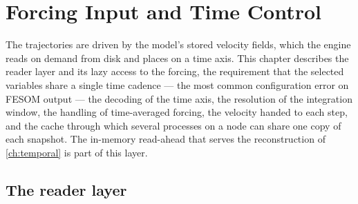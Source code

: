\chapter{Forcing Input and Time Control}\label{ch:input}

The trajectories are driven by the model's stored velocity fields, which the engine reads on demand from disk
and places on a time axis. This chapter describes the reader layer and its lazy access to the forcing, the
requirement that the selected variables share a single time cadence --- the most common configuration error
on FESOM output --- the decoding of the time axis, the resolution of the integration window, the handling of
time-averaged forcing, the velocity handed to each step, and the cache through which several processes on a
node can share one copy of each snapshot. The in-memory read-ahead that serves the reconstruction of
\cref{ch:temporal} is part of this layer.

\section{The reader layer}\label{sec:input-reader}

